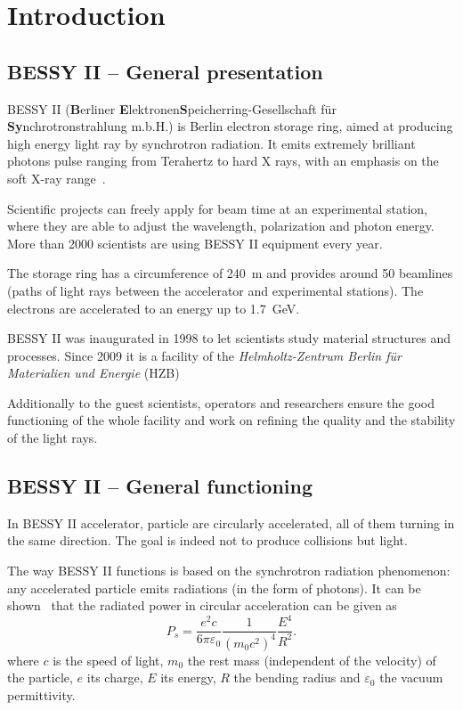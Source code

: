 \chapter{Introduction}
\label{sec:background}

\section{BESSY II -- General presentation}
BESSY II (\textbf{B}erliner \textbf{E}lektronen\-\textbf{S}peicherring-Gesellschaft für \textbf{Sy}n\-chro\-tron\-strahlung m.b.H.) is Berlin electron storage ring, aimed at producing high energy light ray by synchrotron radiation. It emits extremely brilliant photons pulse ranging from Terahertz to hard X rays, with an emphasis on the soft X-ray range~\cite{web:bessy_homepage}.

Scientific projects can freely apply for beam time at an experimental station, where they are able to adjust the wavelength, polarization and photon energy. More than 2000 scientists are using BESSY II equipment every year.

The storage ring has a circumference of \SI{240}{\meter} and provides around 50 beamlines (paths of light rays between the accelerator and experimental stations). The electrons are accelerated to an energy up to \SI{1.7}{\giga\electronvolt}.

BESSY II was inaugurated in 1998 to let scientists study material structures and processes. Since 2009 it is a facility of the \textit{Helmholtz-Zentrum Berlin für Materialien und Energie} (HZB)

Additionally to the guest scientists, operators and researchers ensure the good functioning of the whole facility and work on refining the quality and the stability of the light rays.

\section{BESSY II -- General functioning}
In BESSY II  accelerator, particle are circularly accelerated, all of them turning in the same direction. The goal is indeed not to produce collisions but light.

The way BESSY II functions is based on the synchrotron radiation phenomenon: any accelerated particle emits radiations (in the form of photons). It can be shown~\cite{book:wille} that the radiated power in circular acceleration can be given as
\begin{equation}
P_s = \frac{e^2 c}{6 \pi \varepsilon_0}\frac{1}{(m_0 c^2)^4}\frac{E^4}{R^2}.
\end{equation}
where $c$ is the speed of light, $m_0$ the rest mass (independent of the velocity) of the particle, $e$ its charge, $E$ its energy, $R$ the bending radius and $\varepsilon_0$ the  vacuum permittivity.

